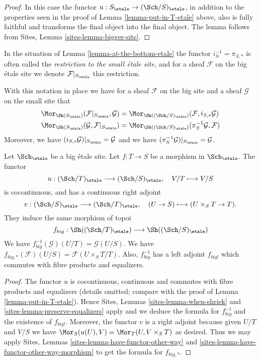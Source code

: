 \begin{proof}
In this case the functor
$u : S_\etale \to (\Sch/S)_\etale$,
in addition to the properties seen in the proof of
Lemma \ref{lemma-put-in-T-etale} above, also is fully faithful
and transforms the final object into the final object.
The lemma follows from Sites, Lemma \ref{sites-lemma-bigger-site}.
\end{proof}

\begin{definition}
\label{definition-restriction-small-etale}
In the situation of
Lemma \ref{lemma-at-the-bottom-etale}
the functor $i_S^{-1} = \pi_{S, *}$ is often
called the {\it restriction to the small \'etale site}, and for a sheaf
$\mathcal{F}$ on the big \'etale site we denote
$\mathcal{F}|_{S_\etale}$ this restriction.
\end{definition}

\noindent
With this notation in place we have for a sheaf $\mathcal{F}$ on the
big site and a sheaf $\mathcal{G}$ on the small site that
\begin{align*}
\Mor_{\Sh(S_\etale)}(
\mathcal{F}|_{S_\etale},
\mathcal{G})
& =
\Mor_{\Sh((\Sch/S)_\etale)}(
\mathcal{F},
i_{S, *}\mathcal{G}) \\
\Mor_{\Sh(S_\etale)}(
\mathcal{G},
\mathcal{F}|_{S_\etale})
& =
\Mor_{\Sh((\Sch/S)_\etale)}(
\pi_S^{-1}\mathcal{G},
\mathcal{F})
\end{align*}
Moreover, we have $(i_{S, *}\mathcal{G})|_{S_\etale} = \mathcal{G}$
and we have $(\pi_S^{-1}\mathcal{G})|_{S_\etale} = \mathcal{G}$.

\begin{lemma}
\label{lemma-morphism-big-etale}
Let $\Sch_\etale$ be a big \'etale site.
Let $f : T \to S$ be a morphism in $\Sch_\etale$.
The functor
$$
u :
(\Sch/T)_\etale
\longrightarrow
(\Sch/S)_\etale,
\quad
V/T \longmapsto V/S
$$
is cocontinuous, and has a continuous right adjoint
$$
v :
(\Sch/S)_\etale
\longrightarrow
(\Sch/T)_\etale,
\quad
(U \to S) \longmapsto (U \times_S T \to T).
$$
They induce the same morphism of topoi
$$
f_{big} :
\Sh((\Sch/T)_\etale)
\longrightarrow
\Sh((\Sch/S)_\etale)
$$
We have $f_{big}^{-1}(\mathcal{G})(U/T) = \mathcal{G}(U/S)$.
We have $f_{big, *}(\mathcal{F})(U/S) = \mathcal{F}(U \times_S T/T)$.
Also, $f_{big}^{-1}$ has a left adjoint $f_{big!}$ which commutes with
fibre products and equalizers.
\end{lemma}

\begin{proof}
The functor $u$ is cocontinuous, continuous and commutes with fibre products
and equalizers (details omitted; compare with the proof of
Lemma \ref{lemma-put-in-T-etale}).
Hence
Sites, Lemmas \ref{sites-lemma-when-shriek} and
\ref{sites-lemma-preserve-equalizers}
apply and we deduce the formula
for $f_{big}^{-1}$ and the existence of $f_{big!}$. Moreover,
the functor $v$ is a right adjoint because given $U/T$ and $V/S$
we have $\Mor_S(u(U), V) = \Mor_T(U, V \times_S T)$
as desired. Thus we may apply
Sites, Lemmas \ref{sites-lemma-have-functor-other-way} and
\ref{sites-lemma-have-functor-other-way-morphism} to get the
formula for $f_{big, *}$.
\end{proof}

